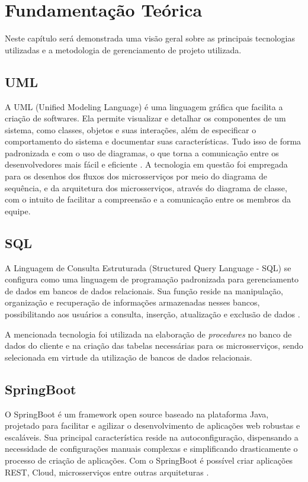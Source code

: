 \chapter{Fundamentação Teórica}
\label{cap:fundamentacao}
Neste capítulo será demonstrada uma visão geral sobre as principais tecnologias
utilizadas e a metodologia de gerenciamento de projeto utilizada.


\section{UML}
A UML (Unified Modeling Language) é uma linguagem gráfica que facilita a criação de softwares. Ela permite visualizar e 
detalhar os componentes de um sistema, como classes, objetos e suas interações, além de especificar o comportamento do 
sistema e documentar suas características. Tudo isso de forma padronizada e com o uso de diagramas, o que torna a 
comunicação entre os desenvolvedores mais fácil e eficiente \cite{uml:explicacao}. 
A tecnologia em questão foi empregada para os desenhos dos fluxos dos microsserviços por meio do diagrama de sequência, e 
da arquitetura dos microsserviços, através do diagrama de classe, com o intuito de facilitar a compreensão e a comunicação
entre os membros da equipe.


\section{SQL}
A Linguagem de Consulta Estruturada (Structured Query Language - SQL) se configura como uma linguagem de programação 
padronizada para gerenciamento de dados em bancos de dados relacionais. Sua função reside na manipulação, 
organização e recuperação de informações armazenadas nesses bancos, possibilitando aos usuários a consulta, inserção,
atualização e exclusão de dados \cite{sql:explicacao}.

A mencionada tecnologia foi utilizada na elaboração de \textit{procedures} no banco de dados do cliente e na criação das 
tabelas necessárias para os microsserviços, sendo selecionada em virtude da utilização de bancos de dados relacionais.


\section{SpringBoot}
O SpringBoot é um framework open source baseado na plataforma Java, projetado para facilitar e 
agilizar o desenvolvimento de aplicações web robustas e escaláveis. Sua principal característica reside na 
autoconfiguração, dispensando a necessidade de configurações manuais complexas e simplificando drasticamente o processo 
de criação de aplicações. Com o SpringBoot é possível criar aplicações REST, Cloud, microsserviços entre outras 
arquiteturas \cite{spring:explicacao}.

